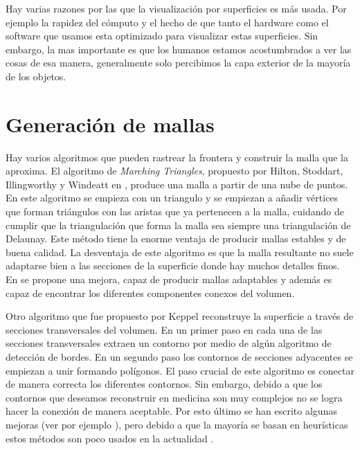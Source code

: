 Hay varias razones por las que la visualización por superficies es más usada. Por ejemplo la rapidez del cómputo y el hecho de que tanto el hardware como el software que usamos esta optimizado para visualizar estas superficies. Sin embargo, la mas importante es que los humanos estamos acostumbrados a ver las cosas de esa manera, generalmente solo percibimos la capa exterior de la mayoría de los objetos.
\section{Generación de mallas}
\label{sec:generarMallas}
Hay varios algoritmos que pueden rastrear la frontera y construir la malla que la aproxima. El algoritmo de \emph{Marching Triangles}, propuesto por Hilton,  Stoddart, Illingworthy y Windeatt en \cite{marchingTriangles}, produce una malla a partir de una nube de puntos. En este algoritmo se empieza con un triangulo y se empiezan a añadir vértices que forman triángulos con las aristas que ya pertenecen a la malla, cuidando de cumplir que la triangulación que forma la malla sea siempre una triangulación de Delaunay. Este método tiene la enorme ventaja de producir mallas estables y de buena calidad. La desventaja de este algoritmo es que la malla resultante no suele adaptarse bien a las secciones de la superficie donde hay muchos detalles finos. En \cite{regionGrowingExtraction} se propone una mejora, capaz de producir mallas adaptables y además es capaz de encontrar los diferentes componentes conexos del volumen.

Otro algoritmo que fue propuesto por Keppel \cite{contoursKeppel} reconstruye la superficie a través de secciones transversales del volumen. En un primer paso en cada una de las secciones transversales extraen un contorno por medio de algún algoritmo de detección de bordes. En un segundo paso los contornos de secciones adyacentes se empiezan a unir formando polígonos. El paso crucial de este algoritmo es conectar de manera correcta los diferentes contornos. Sin embargo, debido a que los contornos que deseamos reconstruir en medicina son muy complejos no se logra hacer la conexión de manera aceptable. Por esto último se han escrito algunas mejoras (ver por ejemplo \cite{improvementCoutours}), pero debido a que la mayoría se basan en heurísticas estos métodos son poco usados en la actualidad \cite{focOnSciVis}. 

